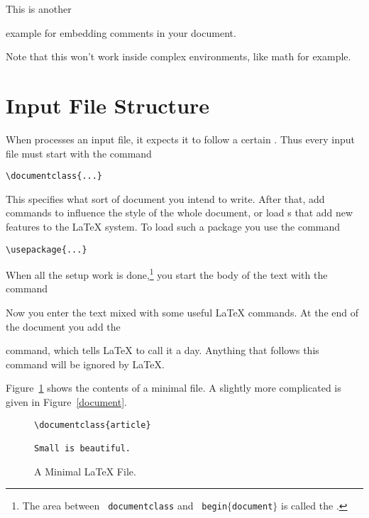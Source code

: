 \begin{example}
This is another
\begin{comment}
rather stupid,
but helpful
\end{comment}
example for embedding
comments in your document.
\end{example}

Note that this won't work inside complex environments, like math for example.

\section{Input File Structure}

When \LaTeXe{} processes an input file, it expects it to follow a
certain . Thus every input file must start with the
command
\begin{code}
\verb|\documentclass{...}|
\end{code}
This specifies what sort of document you intend to write. After that,
add commands to influence the style of the whole
document, or load s that add new
features to the \LaTeX{} system. To load such a package you use the
command
\begin{code}
\verb|\usepackage{...}|
\end{code}

When all the setup work is done,\footnote{The area between \texttt{\bs
    documentclass} and \texttt{\bs
    begin$\mathtt{\{}$document$\mathtt{\}}$} is called the
  \emph{}.} you start the body of the text with the
command

\begin{code}
\verb||
\end{code}

Now you enter the text mixed with some useful \LaTeX{} commands.  At
the end of the document you add the
\begin{code}
\verb||
\end{code}
command, which tells \LaTeX{} to call it a day. Anything that
follows this command will be ignored by \LaTeX.

Figure~\ref{mini} shows the contents of a minimal \LaTeXe{} file. A
slightly more complicated  is given in
Figure~\ref{document}.

\begin{figure}[!bp]
\begin{lined}{6cm}
\begin{verbatim}
\documentclass{article}

Small is beautiful.

\end{verbatim}
\end{lined}
\caption{A Minimal \LaTeX{} File.} \label{mini}
\end{figure}
 
